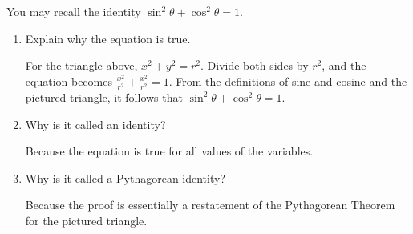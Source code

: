 \documentclass[nooutcomes]{ximera}
\begin{document}
\begin{problem}
You may recall the identity $\sin^2\theta+\cos^2\theta=1$.  
\begin{enumerate}
\item Explain why the equation is true.  \begin{hint}For the triangle above, $x^2 + y^2 = r^2$.  Divide both sides by $r^2$, and the equation becomes $\frac{x^2}{r^2} + \frac{x^2}{r^2} = 1$.  From the definitions of sine and cosine and the pictured triangle, it follows that $\sin^2\theta+\cos^2\theta=1$.\end{hint}
\item Why is it called an identity?  \begin{hint}Because the equation is true for all values of the variables.\end{hint}
\item Why is it called a Pythagorean identity?  \begin{hint}Because the proof is essentially a restatement of the Pythagorean Theorem for the pictured triangle.\end{hint}
\end{enumerate}
\begin{freeResponse}
\end{freeResponse}
\end{problem}
\end{document}
